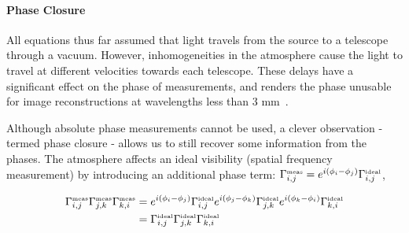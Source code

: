 {\vspace{-0.15in}
\paragraph{Phase Closure} All equations thus far assumed that light travels from the source to a telescope through a vacuum. However, inhomogeneities in the atmosphere cause the light to travel at different velocities towards each telescope. These delays have a significant effect on the phase of measurements, and renders the phase unusable for image reconstructions at wavelengths less than 3 mm~\cite{monnier2013radio}. 

Although absolute phase measurements cannot be used, a clever observation - termed phase closure - allows us to still recover some information from the phases. 
The atmosphere affects an ideal visibility (spatial frequency measurement) by 
introducing an additional phase term: $\Gamma_{i,j}^{\mbox{\tiny{meas}}} = e^{i(\phi_i - \phi_j)}\Gamma_{i,j}^{\mbox{\tiny{ideal}}}$,

\vspace{-.2in}
\begin{align}  
\notag \Gamma^{\mbox{\tiny{meas}}}_{i,j}\Gamma^{\mbox{\tiny{meas}}}_{j,k}\Gamma^{\mbox{\tiny{meas}}}_{k,i} &= e^{i(\phi_i-\phi_j)}\Gamma^{\mbox{\tiny{ideal}}}_{i,j}e^{i(\phi_j-\phi_k)}\Gamma^{\mbox{\tiny{ideal}}}_{j,k}e^{i(\phi_k-\phi_i)}\Gamma^{\mbox{\tiny{ideal}}}_{k,i} \\
&=\Gamma^{\mbox{\tiny{ideal}}}_{i,j}\Gamma^{\mbox{\tiny{ideal}}}_{j,k}\Gamma^{\mbox{\tiny{ideal}}}_{k,i} 
\label{eq:phaseclosure} 
 \end{align}
 


}

